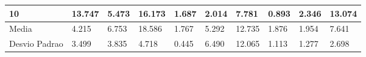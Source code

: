 \begin{table}[!h]
{\begin{tabular}{|l|l|l|l|l|l|l|l|l|l|}
10            & 13.747          & 5.473                 & 16.173                & 1.687           & 2.014                 & 7.781                 & 0.893           & 2.346                 & 13.074                \\ \hline
Media         & 4.215           & 6.753                 & 18.586                & 1.767           & 5.292                 & 12.735                & 1.876           & 1.954                 & 7.641                 \\ \hline
Desvio Padrao & 3.499           & 3.835                 & 4.718                 & 0.445           & 6.490                 & 12.065                & 1.113           & 1.277                 & 2.698                 \\ \hline
\end{tabular}%
}
\end{table}
